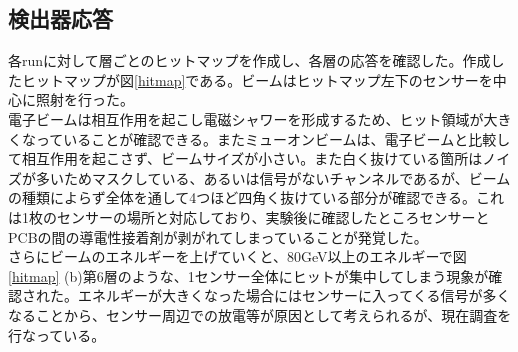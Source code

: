 \subsection{検出器応答}
各runに対して層ごとのヒットマップを作成し、各層の応答を確認した。作成したヒットマップが図\ref{hitmap}である。ビームはヒットマップ左下のセンサーを中心に照射を行った。\\
電子ビームは相互作用を起こし電磁シャワーを形成するため、ヒット領域が大きくなっていることが確認できる。またミューオンビームは、電子ビームと比較して相互作用を起こさず、ビームサイズが小さい。また白く抜けている箇所はノイズが多いためマスクしている、あるいは信号がないチャンネルであるが、ビームの種類によらず全体を通して4つほど四角く抜けている部分が確認できる。これは1枚のセンサーの場所と対応しており、実験後に確認したところセンサーとPCBの間の導電性接着剤が剥がれてしまっていることが発覚した。\\
さらにビームのエネルギーを上げていくと、80GeV以上のエネルギーで図\ref{hitmap} (b)第6層のような、1センサー全体にヒットが集中してしまう現象が確認された。エネルギーが大きくなった場合にはセンサーに入ってくる信号が多くなることから、センサー周辺での放電等が原因として考えられるが、現在調査を行なっている。

